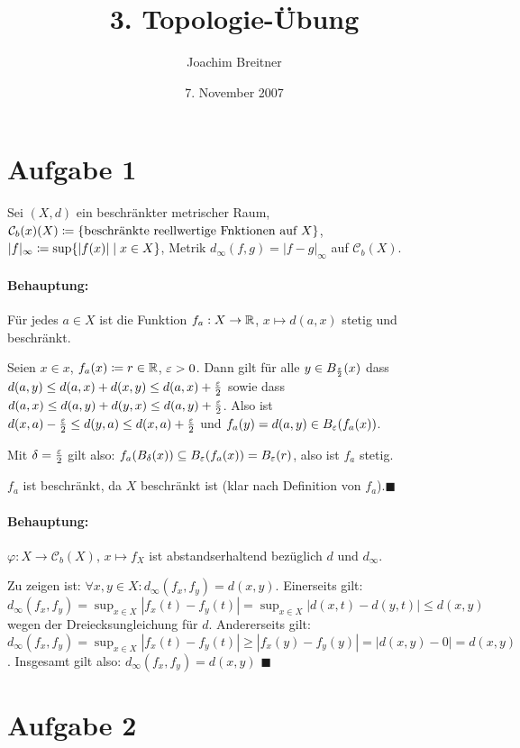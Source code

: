 \documentclass{article}
\title{3. Topologie-Übung}
\author{Joachim Breitner}
\date{7. November 2007}
\begin{document}
\maketitle
\section*{Aufgabe 1}

Sei $(X, d)$ ein beschränkter metrischer Raum, $\mathcal C_b(x) (X) \mathrel{\mbox{$\coloneqq$}} \{\text{beschränkte reellwertige Fnktionen auf $X$}\}$, $|f|_\infty \mathrel{\mbox{$\coloneqq$}} \sup \{ |f(x)| \mid x \in X\}$, Metrik $d_\infty(f,g) = |f-g|_\infty$ auf $\mathcal C_b(X)$.

\paragraph{Behauptung:} Für jedes $a\in X$ ist die Funktion $f_a: X\to \mathbb{R}$, $x\mapsto d(a,x)$ stetig und beschränkt.

Seien $x\in x$, $f_a(x) \mathrel{\mbox{$\coloneqq$}} r \in \mathbb{R}$, $\varepsilon > 0$. Dann gilt für alle $y\in B_{\frac{\varepsilon}2}(x)$ dass $d(a,y) \le d(a,x) + d(x,y) \le d(a,x) + \frac{\varepsilon}2$ sowie dass $d(a,x) \le d(a,y) + d(y,x) \le d(a,y) + \frac{\varepsilon}2$. Also ist $d(x,a)-\frac{\varepsilon}2 \le d(y,a) \le d(x,a) + \frac{\varepsilon}2$ und $f_a(y)= d(a,y) \in B_\varepsilon(f_a(x))$.

Mit $\delta = \frac{\varepsilon}2$ gilt also: $f_a(B_\delta(x)) \subseteq B_\varepsilon(f_a(x)) = B_\varepsilon(r)$, also ist $f_a$ stetig.

$f_a$ ist beschränkt, da $X$ beschränkt ist (klar nach Definition von $f_a$).\hfill$\blacksquare$

\paragraph{Behauptung:} $\varphi : X\to \mathcal C_b(X)$, $x\mapsto f_X$ ist abstandserhaltend bezüglich $d$ und $d_\infty$.

Zu zeigen ist: $\forall x,y\in X: d_\infty(f_x,f_y) = d(x,y)$. Einerseits gilt: $d_\infty(f_x,f_y) = \sup_{x\in X} | f_x(t) - f_y(t) | = \sup _{x\in X} |d(x,t) - d(y,t)| \le d(x,y)$ wegen der Dreiecksungleichung für $d$. Andererseits gilt: $d_\infty(f_x, f_y) = \sup_{x\in X} |f_x(t) - f_y(t)| \ge |f_x(y) - f_y(y)| = |d(x,y) - 0| = d(x,y)$. Insgesamt gilt also: $d_\infty(f_x,f_y) = d(x,y)$ \hfill$\blacksquare$

\section*{Aufgabe 2}
\end{document}
